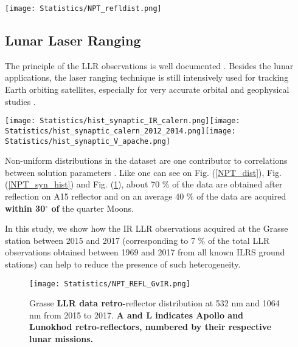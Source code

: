 \documentclass[fleqn,usenatbib,referee]{mnras}
\begin{document}
\begin{figure*}
    \centering
    \texttt{[image: Statistics/NPT\_refldist.png]}
    \caption{Histogram of annual frequency of LLR data with relative contribution from each LRR array including Grasse IR (1064 nm) observations. Points indicate the annual mean of post-fit residuals (in cm) obtained with INPOP17a. The dominance of range observations to A15 is evident. A change can be noticed after 2014 due to the contribution from IR at Grasse. \textbf{The values in percentage indicate the LLR data contribution from each participating station.}}
    \label{NPT_dist}
    \end{figure*}

\subsection{Lunar Laser Ranging}
  \label{npt}
  The principle of the LLR observations is well documented \textbf{\citep[]{Murphy2012,Murphy2013a}}. Besides the lunar applications, the laser ranging technique is still intensively used for tracking Earth orbiting satellites, especially for very accurate orbital \citep[]{2013MNRAS.432.2591P,2015CQGra..32o5012L} and geophysical studies \textbf{\citep[]{Jeon2011,2013GeoRL..40.4662M}}.
  
 \begin{figure*}
    \centering
         \texttt{[image: Statistics/hist\_synaptic\_IR\_calern.png]}\texttt{[image: Statistics/hist\_synaptic\_calern\_2012\_2014.png]}\texttt{[image: Statistics/hist\_synaptic\_V\_apache.png]}
          \caption{Histogram of synodic distribution of normal points obtained at Apache Point (c), at the Grasse station from 2012 from 2014 at 542 nm (b) and from 2014 to 2016 at 1064 nm (a). Q indicates the quarter Moon phase.}
           \label{NPT_syn_hist}
    \end{figure*}

Non-uniform distributions in the dataset are one contributor to correlations between solution parameters \citep[]{Williams2009}. Like one can see on Fig. (\ref{NPT_dist}), Fig. (\ref{NPT_syn_hist}) and Fig. (\ref{NPT_REFL}), about 70 \% of the data are obtained after reflection on A15 reflector and on an average 40 $\%$ of the data are acquired \textbf{within 30$^{\circ}$ of }the quarter Moons. 
    
In this study, we show how the IR LLR observations acquired at the Grasse station between 2015 and 2017 (corresponding to 7 \% of the total LLR observations obtained between 1969 and 2017 from all known ILRS ground stations) can help to reduce the presence of such heterogeneity.
\begin{figure}
      \centering
      \texttt{[image: Statistics/NPT\_REFL\_GvIR.png]}
      \caption{Grasse \textbf{LLR data retro-}reflector distribution at 532 nm and 1064 nm from 2015 to 2017. \textbf{A and L indicates Apollo and Lunokhod retro-reflectors, numbered by their respective lunar missions.}}
      \label{NPT_REFL}
\end{figure}
      
\end{document}
